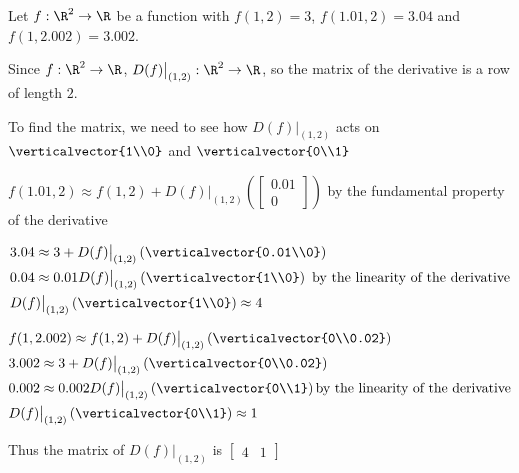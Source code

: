 \documentclass{ximera}
\begin{document}
\begin{question} 
Let $f:\R^2 \to \R$ be a function with $f(1,2) = 3$, $f(1.01,2) = 3.04$ and $f(1,2.002) = 3.002$.  

\begin{solution}
	\begin{hint}	
		Since $f:\R^2 \to \R$, $D(f)\big|_{(1,2)}: \R^2 \to \R$, so the matrix of the derivative is a row of length $2$.
	\end{hint}
	\begin{hint}
		To find the matrix, we need to see how $ D(f)\big|_{(1,2)}$ acts on $\verticalvector{1\\0}$ and $\verticalvector{0\\1}$
	\end{hint}
	\begin{hint}
		$f(1.01,2) \approx f(1,2) + D(f)\big|_{(1,2)}\left( \begin{bmatrix}0.01\\0\end{bmatrix} \right)$ by the fundamental property of the derivative
	\end{hint}
	\begin{hint}
		\begin{align*}
		& 3.04  \approx 3+ D(f)\big|_{(1,2)}\left( \verticalvector{0.01\\0} \right) \\
		& 0.04  \approx 0.01D(f)\big|_{(1,2)}\left( \verticalvector{1\\0} \right) \text{ by the linearity of the derivative}\\
		& D(f)\big|_{(1,2)}\left( \verticalvector{1\\0} \right) \approx 4
		\end{align*}
	\end{hint}
	\begin{hint}
		\begin{align*}
		&f(1,2.002) \approx f(1,2) + D(f)\big|_{(1,2)}\left( \verticalvector{0\\0.02} \right)\\
		&3.002 \approx 3+ D(f)\big|_{(1,2)}\left( \verticalvector{0\\0.02} \right)\\
		&0.002 \approx 0.002D(f)\big|_{(1,2)}\left( \verticalvector{0\\1} \right) \text{by the linearity of the derivative}\\
		&D(f)\big|_{(1,2)}\left( \verticalvector{0\\1} \right) \approx 1
		\end{align*}
	\end{hint}
	\begin{hint}
		Thus the matrix of $D(f)\big|_{(1,2)}$ is $\begin{bmatrix} 4 & 1\end{bmatrix}$
	\end{hint}
	

\end{solution}
\end{question}
\end{document}
